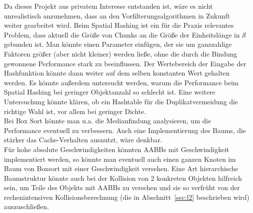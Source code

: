 Da dieses Projekt aus privatem Interesse entstanden ist, wäre es nicht unrealistisch anzunehmen, dass an den Vorfilterungsalgorithmen in Zukunft weiter gearbeitet wird. Beim Spatial Hashing ist ein für die Praxis relevantes Problem, dass aktuell die Größe von Chunks an die Größe der Einheitslänge in $\mathcal{S}$ gebunden ist. Man könnte einen Parameter einfügen, der sie um ganzzahlige Faktoren größer (aber nicht kleiner) werden ließe, ohne die durch die Bindung gewonnene Performance stark zu beeinflussen. Der Wertebereich der Eingabe der Hashfunktion könnte dann weiter auf dem selben konstanten Wert gehalten werden. Es könnte außerdem untersucht werden, warum die Performance beim Spatial Hashing bei geringer Objektanzahl so schlecht ist. Eine weitere Untersuchung könnte klären, ob ein Hashtable für die Duplikatvermeidung die richtige Wahl ist, vor allem bei geringer Dichte.\\
Bei Box Sort könnte man u.a. die Medianfindung analysieren, um die Performance eventuell zu verbessern. Auch eine Implementierung des Baums, die stärker das Cache-Verhalten ausnutzt, wäre denkbar.\\
Für hohe absolute Geschwindigkeiten könnten AABBs mit Geschwindigkeit implementiert werden, so könnte man eventuell auch einen ganzen Knoten im Baum von Boxsort mit einer Geschwindigkeit versehen. Eine Art hierarchische Baumstruktur könnte auch bei der Kollision von 2 konkreten Objekten hilfreich sein, um Teile des Objekts mit AABBs zu versehen und sie so verfrüht von der rechenintensiven Kollisionsberechnung (die in Abschnitt~\ref{sec:l2} beschrieben wird) auszuschließen.\\

